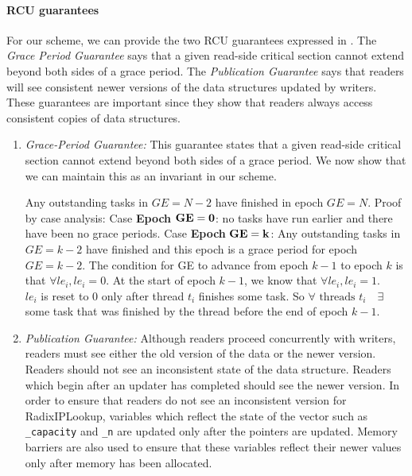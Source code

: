 \documentclass[a4paper]{article}
\begin{document}
\paragraph{RCU guarantees} 
For our scheme, we can provide the two RCU guarantees expressed in \cite{urcu}. The \emph{Grace Period Guarantee} says that a given read-side critical section cannot extend beyond both sides of a grace period. The \emph{Publication Guarantee} says that readers will see consistent newer versions of the data structures updated by writers. These guarantees are important since they show that readers always access consistent copies of data structures. 
\begin{enumerate}
\item \emph{Grace-Period Guarantee:} This guarantee states that a given read-side critical section cannot extend beyond both sides of a grace period. We now show that we can maintain this as an invariant in our scheme.

\begin{algorithmic}
\STATE Any outstanding tasks in $GE=N-2$ have finished in epoch $GE=N$.
\STATE Proof by case analysis:
\STATE Case \textbf{Epoch} $\bf GE=0$: no tasks have run earlier and there have been no grace periods.
\STATE Case \textbf{Epoch} $\bf GE=k$: Any outstanding tasks in $GE=k-2$ have finished and this epoch is a grace period for epoch $GE=k-2$. 
\STATE The condition for GE to advance from epoch $k-1$ to epoch $k$ is that $\forall le_i, le_i=0$. At the start of epoch $k-1$, we know that $\forall le_i, le_i=1$.\\ $le_i$ is reset to 0 only after thread $t_i$ finishes some task. So $\forall \mbox{ threads }t_i\mbox{ }$ $\exists$ some task that was finished by the thread before the end of epoch $k-1$. 
\end{algorithmic}

\item \emph{Publication Guarantee:} 
Although readers proceed concurrently with writers, readers must see either the old version of the data or the newer version. Readers should not see an inconsistent state of the data structure. Readers which begin after an updater has completed should see the newer version. In order to ensure that readers do not see an inconsistent version for RadixIPLookup, variables which reflect the state of the vector such as \verb+_capacity+ and \verb+_n+ are updated only after the pointers are updated. Memory barriers are also used to ensure that these variables reflect their newer values only after memory has been allocated.\\
\end{enumerate}
\end{document}
